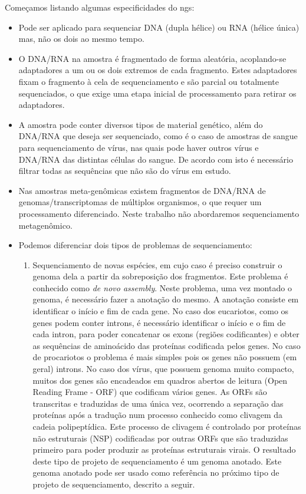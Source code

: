 \documentclass[12pt]{article}
\begin{document}
Começamos listando algumas especificidades do \gls{ngs}:
\begin{itemize}
    \item Pode ser aplicado para sequenciar DNA (dupla hélice) ou RNA (hélice única) mas, não os dois ao mesmo tempo.
    \item O DNA/RNA na amostra é fragmentado de forma aleatória, acoplando-se adaptadores a um ou os dois extremos de cada fragmento. Estes adaptadores fixam o fragmento à cela de sequenciamento e são parcial ou totalmente sequenciados, o que exige uma etapa inicial de processamento para retirar os adaptadores.
    \item A amostra pode conter diversos tipos de material genético, além do DNA/RNA que deseja ser sequenciado, como é o caso de amostras de sangue para sequenciamento de vírus, nas quais pode haver outros vírus e DNA/RNA das distintas células do sangue. De acordo com isto é necessário filtrar todas as sequências que não são do vírus em estudo.
    \item Nas amostras meta-genômicas existem fragmentos de DNA/RNA de genomas/transcriptomas de múltiplos organismos, o que requer um processamento diferenciado. Neste trabalho não abordaremos sequenciamento metagenômico.
    \item Podemos diferenciar dois tipos de problemas de sequenciamento:
          \begin{enumerate}
              \item Sequenciamento de novas espécies, em cujo caso é preciso construir o genoma dela a partir da sobreposição dos fragmentos. Este problema é conhecido como {\it{de novo assembly}}. Neste problema, uma vez montado o genoma, é necessário fazer a anotação do mesmo. A anotação consiste em identificar o início e fim de cada gene. No caso dos eucariotos, como os genes podem conter introns, é necessário identificar o início e o fim de cada intron, para poder concatenar os exons (regiões codificantes) e obter as sequências de aminoácido das proteínas codificada pelos genes. No caso de procariotos o problema é mais simples pois os genes não possuem (em geral) introns. No caso dos vírus, que possuem genoma muito compacto, muitos dos genes são encadeados em quadros abertos de leitura (Open Reading Frame - ORF) que codificam vários genes. As ORFs são transcritas e traduzidas de uma única vez, ocorrendo a separação das proteínas após a tradução num processo conhecido como clivagem da cadeia polipeptídica. Este processo de clivagem é controlado por proteínas não estruturais (NSP) codificadas por outras ORFs que são traduzidas primeiro para poder produzir as proteínas estruturais virais. O resultado deste tipo de projeto de sequenciamento é um genoma anotado. Este genoma anotado pode ser usado como referência no próximo tipo de projeto de sequenciamento, descrito a seguir.


\end{enumerate}
\end{itemize}
\end{document}
